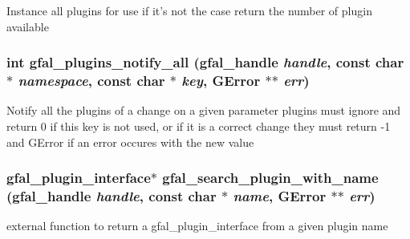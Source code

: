 Instance all plugins for use if it's not the case return the number of plugin available 
\subsubsection{\setlength{\rightskip}{0pt plus 5cm}int gfal\_\-plugins\_\-notify\_\-all (gfal\_\-handle {\em handle}, const char $\ast$ {\em namespace}, const char $\ast$ {\em key}, GError $\ast$$\ast$ {\em err})}\label{gfal__common__plugin_8c_4594ecd9436c82f11317d0a3a2672c0b}


Notify all the plugins of a change on a given parameter plugins must ignore and return 0 if this key is not used, or if it is a correct change they must return -1 and GError if an error occures with the new value 
\subsubsection{\setlength{\rightskip}{0pt plus 5cm}\bf{gfal\_\-plugin\_\-interface}$\ast$ gfal\_\-search\_\-plugin\_\-with\_\-name (gfal\_\-handle {\em handle}, const char $\ast$ {\em name}, GError $\ast$$\ast$ {\em err})}\label{gfal__common__plugin_8c_bd45330c7e213e68805dbb1505101275}


external function to return a gfal\_\-plugin\_\-interface from a given plugin name 